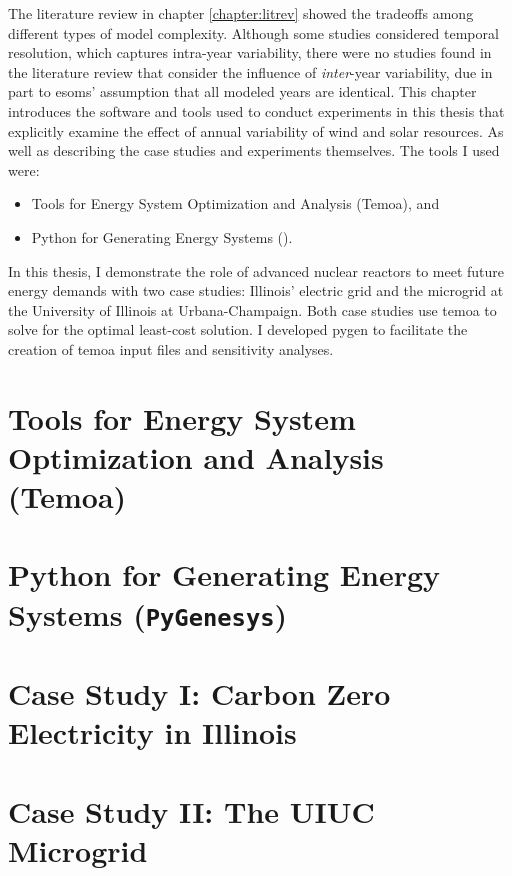 The literature review in chapter \ref{chapter:litrev} showed the tradeoffs among
different types of model complexity. Although some studies considered temporal
resolution, which captures intra-year variability, there were no studies found in
the literature review that consider the influence of \textit{inter}-year variability,
due in part to \glspl{esom}' assumption that all modeled years are identical.
This chapter introduces the software and tools used to conduct experiments in this
thesis that explicitly examine the effect of annual variability of wind and solar
resources. As well as describing the case studies and experiments themselves.
The tools I used were:
\begin{itemize}
  \item Tools for Energy System Optimization and Analysis (Temoa), and
  \item Python for Generating Energy Systems (\pygen).
\end{itemize}
In this thesis, I demonstrate the role of advanced nuclear reactors to meet future
energy demands with two case studies: Illinois’ electric grid and the microgrid
at the University of Illinois at Urbana-Champaign. Both case studies use \gls{temoa}
\cite{decarolis_temoa_2010} to solve for the optimal least-cost solution. I
developed \gls{pygen} \cite{dotson_python_2021} to facilitate the creation of
\gls{temoa} input files and sensitivity analyses.

\section{Tools for Energy System Optimization and Analysis (Temoa)}


\section{Python for Generating Energy Systems (\texttt{PyGenesys})}



\section{Case Study I: Carbon Zero Electricity in Illinois}
\label{section:ilmodel}


\section{Case Study II: The UIUC Microgrid}
\label{section:uiucmodel}



